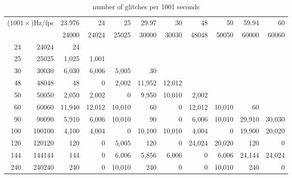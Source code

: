 \documentclass[11pt,a4paper]{article}
\theoremstyle{plain}
\theoremstyle{definition}
\theoremstyle{remark}
\begin{document}
\begin{table}[]
\centering
\begin{tabular}{|r|r||r|r|r|r|r|r|r|r|r|}
\hline\hline
\multicolumn{2}{|c||}{\multirow{2}{*}{($1001\times$)Hz/fps}} & 23.976 & 24 & 25 & 29.97 & 30 & 48 & 50 & 59.94 & 60 \\
\multicolumn{2}{|c||}{} & 24000 & 24024 & 25025 & 30000 & 30030 & 48048 & 50050 & 60000 & 60060 \\
\hline\hline
24 & 24024 & 24 &  &  &  &  &  &  &  &  \\
\hline
25 & 25025 & 1,025 & 1,001 &  &  &  &  &  &  &  \\
\hline
30 & 30030 & 6,030 & 6,006 & 5,005 & 30 &  &  &  &  &  \\
\hline
48 & 48048 & 48 & 0 & 2,002 & 11,952 & 12,012 &  &  &  &  \\
\hline
50 & 50050 & 2,050 & 2,002 & 0 & 9,950 & 10,010 & 2,002 &  &  &  \\
\hline
60 & 60060 & 11,940 & 12,012 & 10,010 & 60 & 0 & 12,012 & 10,010 & 60 &  \\
\hline
90 & 90090 & 5,910 & 6,006 & 10,010 & 90 & 0 & 6,006 & 10,010 & 29,910 & 30,030 \\
\hline
100 & 100100 & 4,100 & 4,004 & 0 & 10,100 & 10,010 & 4,004 & 0 & 19,900 & 20,020 \\
\hline
120 & 120120 & 120 & 0 & 5,005 & 120 & 0 & 24,024 & 20,020 & 120 & 0 \\
\hline
144 & 144144 & 144 & 0 & 6,006 & 5,856 & 6,006 & 0 & 6,006 & 24,144 & 24,024 \\
\hline
240 & 240240 & 240 & 0 & 10,010 & 240 & 0 & 0 & 10,010 & 240 & 0\\
\hline
\hline
\end{tabular}
\caption{number of glitches per 1001 seconds}\label{tab_glitches}
\end{table}
\end{document}
